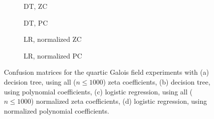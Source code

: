 \documentclass[letterpaper, 10pt]{article}
\newcommand{\1}{\mathds{1}}	%
\theoremstyle{definition}
\theoremstyle{remark}
\begin{document}
\begin{figure}[h]
    \centering
    \begin{subfigure}[t]{0.23\textwidth}
        \centering
        \caption{DT, ZC}
        \label{fig:quartic_dt_zc}
    \end{subfigure}
    \hfill
    \begin{subfigure}[t]{0.23\textwidth}
        \centering
        \caption{DT, PC}
        \label{fig:quartic_dt_pc}
    \end{subfigure}
    \hfill
    \begin{subfigure}[t]{0.23\textwidth}
        \centering
        \caption{LR, normalized ZC}
        \label{fig:quartic_lr_zc_normalized}
    \end{subfigure}
    \hfill
    \begin{subfigure}[t]{0.23\textwidth}
        \centering
        \caption{LR, normalized PC}
        \label{fig:quartic_lr_pc_normalized}
    \end{subfigure}
    \caption{Confusion matrices for the quartic Galois field experiments with (a) decision tree, using all ($n \le 1000$) zeta coefficients, (b) decision tree, using polynomial coefficients, (c) logistic regression, using all ($n \le 1000$) normalized zeta coefficients, (d) logistic regression, using normalized polynomial coefficients.}
    \label{fig:galois_4_cm}
\end{figure}
\end{document}
